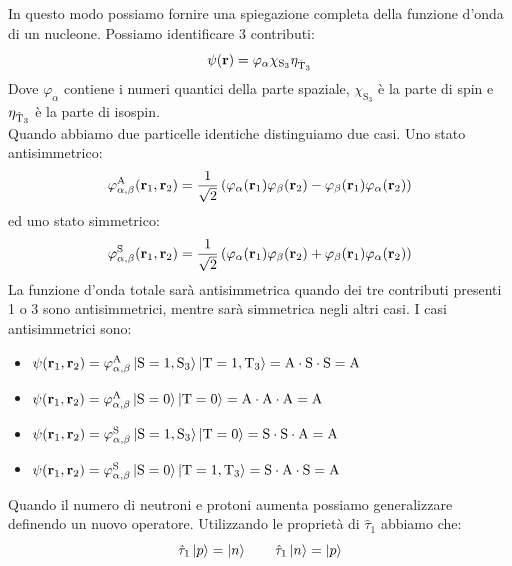 In questo modo possiamo fornire una spiegazione completa della funzione d'onda di un nucleone. Possiamo identificare 3 contributi:
\begin{equation}
  \psi(\vb{r}) = \varphi_{\alpha} \chi_{\text{S}_3} \eta_{\hat{\text{T}}_3}
\end{equation}
Dove $\varphi_{\alpha}$ contiene i numeri quantici della parte spaziale, $\chi_{\text{S}_3}$ è la parte di spin e $\eta_{\hat{\text{T}}_3}$ è la parte di isospin.\\
Quando abbiamo due particelle identiche distinguiamo due casi. Uno stato antisimmetrico:
\begin{equation}
  \varphi_{\alpha,\beta}^{\text{A}}(\vb{r}_1, \vb{r}_2) = \dfrac{1}{\sqrt{2}}\left(\varphi_{\alpha}(\vb{r}_1) \varphi_{\beta}(\vb{r}_2) - \varphi_{\beta}(\vb{r}_1) \varphi_{\alpha}(\vb{r}_2)\right)
\end{equation}
ed uno stato simmetrico:
\begin{equation}
  \varphi_{\alpha,\beta}^{\text{S}}(\vb{r}_1, \vb{r}_2) = \dfrac{1}{\sqrt{2}}\left(\varphi_{\alpha}(\vb{r}_1) \varphi_{\beta}(\vb{r}_2) + \varphi_{\beta}(\vb{r}_1) \varphi_{\alpha}(\vb{r}_2)\right)
\end{equation}
La funzione d'onda totale sarà antisimmetrica quando dei tre contributi presenti 1 o 3 sono antisimmetrici, mentre sarà simmetrica negli altri casi. I casi antisimmetrici sono:
\begin{itemize}
 \item $\psi(\vb{r}_1,\vb{r}_2) = \varphi_{\alpha,\beta}^{\text{A}} \ket{\text{S}=1,\text{S}_3} \ket{\text{T}=1,\text{T}_3} = \text{A} \cdot \text{S} \cdot \text{S} = \text{A}$
 \item $\psi(\vb{r}_1,\vb{r}_2) = \varphi_{\alpha,\beta}^{\text{A}} \ket{\text{S}=0} \ket{\text{T}=0} = \text{A} \cdot \text{A} \cdot \text{A} = \text{A}$
 \item $\psi(\vb{r}_1,\vb{r}_2) = \varphi_{\alpha,\beta}^{\text{S}} \ket{\text{S}=1,\text{S}_3} \ket{\text{T}=0} = \text{S} \cdot \text{S} \cdot \text{A} = \text{A}$
 \item $\psi(\vb{r}_1,\vb{r}_2) = \varphi_{\alpha,\beta}^{\text{S}} \ket{\text{S}=0} \ket{\text{T}=1,\text{T}_3} = \text{S} \cdot \text{A} \cdot \text{S} = \text{A}$
\end{itemize}
Quando il numero di neutroni e protoni aumenta possiamo generalizzare definendo un nuovo operatore. Utilizzando le proprietà di $\hat{\tau}_1$ abbiamo che:
\begin{equation}
 \hat{\tau}_1 \ket{p} = \ket{n} \qquad \hat{\tau}_1 \ket{n} = \ket{p}
\end{equation}
